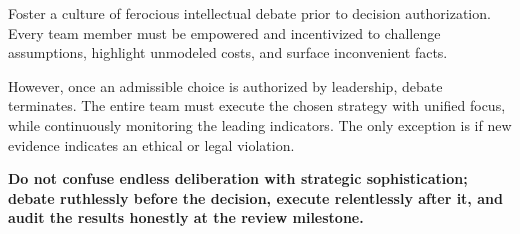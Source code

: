Foster a culture of ferocious intellectual debate prior to decision authorization. Every team member must be empowered and incentivized to challenge assumptions, highlight unmodeled costs, and surface inconvenient facts.

However, once an admissible choice is authorized by leadership, debate terminates. The entire team must execute the chosen strategy with unified focus, while continuously monitoring the leading indicators. The only exception is if new evidence indicates an ethical or legal violation.

\textbf{Do not confuse endless deliberation with strategic sophistication; debate ruthlessly before the decision, execute relentlessly after it, and audit the results honestly at the review milestone.}
